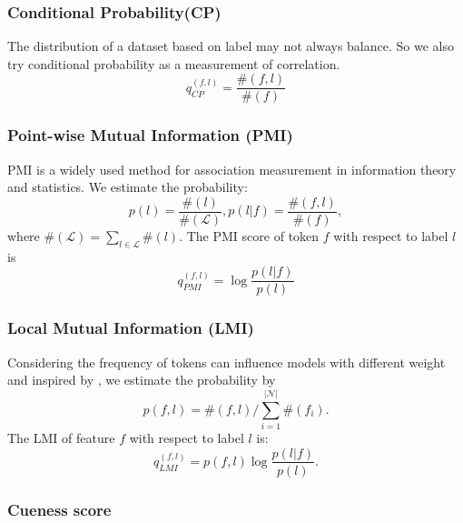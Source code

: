\subsubsection{Conditional Probability(CP)}
The distribution of a dataset based on label may not always balance.
So we also try conditional probability as a measurement of correlation.
\begin{equation}
    q_{CP}^{(f,l)} = \frac{\#(f, l)}{\#(f)}
\end{equation}

\subsubsection{Point-wise Mutual Information (PMI)}
PMI is a widely used method for association measurement in information theory and statistics.
We estimate the probability:
\begin{equation}
p(l) = \frac{\#(l)}{\#(\mathcal{L})}, p(l|f) = \frac{\#(f, l)}{\#(f)},
\end{equation}
where $\#(\mathcal{L}) = \sum_{l\in \mathcal{L}} \#(l)$.
The PMI score of token $f$ with respect to label $l$ is
\begin{equation}
    q_{PMI}^{(f,l)} = \log \frac{p(l|f)}{p(l)}
\end{equation}

\subsubsection{Local Mutual Information (LMI)}
Considering the frequency of tokens can influence models with different weight and inspired
by \cite{schuster2019towards},
we estimate the probability by
\begin{equation}
    p(f, l) = \#(f, l) / \sum_{i=1}^{|\mathcal{N}|}\#(f_i).
\end{equation}
The LMI of feature $f$ with respect to label $l$ is:
\begin{equation}
    q_{LMI}^{(f,l)} = p(f, l)\log \frac{p(l|f)}{p(l)}.
\end{equation}

\subsubsection{Cueness score}
%

